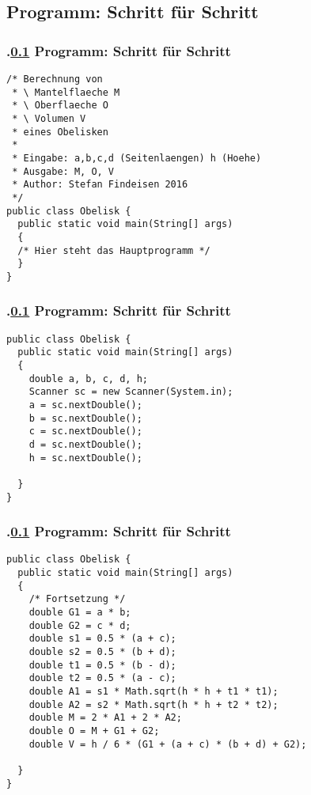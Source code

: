 \def\stitle{Programm: Schritt für Schritt}%
\subsection{\stitle}\label{S:Code}
\begin{frame}[fragile]%
    \frametitle{\kap.\ref{S:Code} \stitle}%

\begin{lstlisting}[style=java,title={Programmgerüst.}]
/* Berechnung von
 * \ Mantelflaeche M
 * \ Oberflaeche O
 * \ Volumen V
 * eines Obelisken
 *
 * Eingabe: a,b,c,d (Seitenlaengen) h (Hoehe)
 * Ausgabe: M, O, V
 * Author: Stefan Findeisen 2016
 */
public class Obelisk {
  public static void main(String[] args)
  {
  /* Hier steht das Hauptprogramm */
  }
}
\end{lstlisting}
\end{frame}


\begin{frame}[fragile]%
    \frametitle{\kap.\ref{S:Code} \stitle}%

\begin{lstlisting}[style=java, title={Lese Seitenlängen und Höhe ein.}]
public class Obelisk {
  public static void main(String[] args)
  {
    double a, b, c, d, h;
    Scanner sc = new Scanner(System.in);
    a = sc.nextDouble();
    b = sc.nextDouble();
    c = sc.nextDouble();
    d = sc.nextDouble();
    h = sc.nextDouble();

  }
}
\end{lstlisting}
\end{frame}


\begin{frame}[fragile]%
    \frametitle{\kap.\ref{S:Code} \stitle}%

\begin{lstlisting}[style=java,frame=t, title={Berechne Hilfsvariablen.}]
public class Obelisk {
  public static void main(String[] args)
  {
    /* Fortsetzung */
    double G1 = a * b;
    double G2 = c * d;
    double s1 = 0.5 * (a + c);
    double s2 = 0.5 * (b + d);
    double t1 = 0.5 * (b - d);
    double t2 = 0.5 * (a - c);
    double A1 = s1 * Math.sqrt(h * h + t1 * t1);
    double A2 = s2 * Math.sqrt(h * h + t2 * t2);
    double M = 2 * A1 + 2 * A2;
    double O = M + G1 + G2;
    double V = h / 6 * (G1 + (a + c) * (b + d) + G2);

  }
}
\end{lstlisting}
\end{frame}
